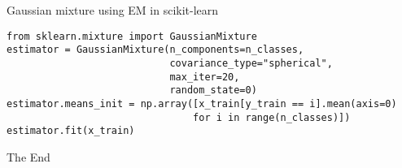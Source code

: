 \documentclass[aspectratio=169]{beamer}
\begin{document}
\begin{frame}[fragile]{Gaussian mixture using EM in scikit-learn}
\begin{verbatim}
from sklearn.mixture import GaussianMixture
estimator = GaussianMixture(n_components=n_classes, 
                            covariance_type="spherical", 
                            max_iter=20, 
                            random_state=0)
estimator.means_init = np.array([x_train[y_train == i].mean(axis=0)
                                for i in range(n_classes)])
estimator.fit(x_train)
\end{verbatim}
\end{frame}


%     
%     




\begin{frame}
    \Huge{\centerline{The End}}
\end{frame}
\end{document}
